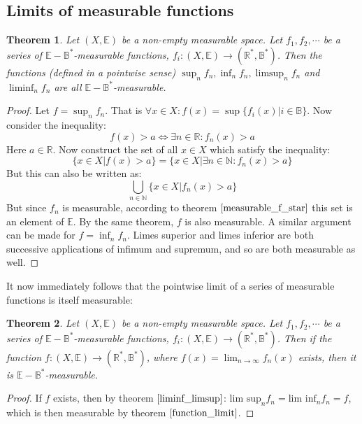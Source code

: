 \documentclass[12pt, a4paper]{article}
\newtheorem{theorem}{Theorem}[section]
\numberwithin{equation}{section}
\begin{document}
\subsection{Limits of measurable functions}
\begin{theorem}
\label{function_limit}
Let $(X,\mathbb{E})$ be a non-empty measurable space. Let $f_1,f_2,\cdots$ be a series of $\mathbb{E}-\mathbb{B}^*$-measurable functions, $f_i: (X,\mathbb{E})\rightarrow(\mathbb{R}^*,\mathbb{B}^*)$. Then the functions (defined in a pointwise sense) $\sup_n f_n, \inf_n f_n, \limsup_n f_n$ and $\liminf_n f_n$ are all $\mathbb{E}-\mathbb{B}^*$-measurable.
\end{theorem}
\begin{proof}
Let $f=\sup_n f_n$. That is $\forall x\in X: f(x)=\sup\{f_i(x)|i\in\mathbb{B}\}$. Now consider the inequality:
\begin{equation}
f(x)>a\Leftrightarrow\exists n\in\mathbb{R}: f_n(x)>a
\end{equation}
Here $a\in\mathbb{R}$. Now construct the set of all $x\in X$ which satisfy the inequality:
\begin{equation}
\{x\in X|f(x)>a\}=\{x\in X|\exists n\in\mathbb{N}: f_n(x)>a\}
\end{equation}
But this can also be written as:
\begin{equation}
\bigcup_{n\in\mathbb{N}}\{x\in X|f_n(x)>a\}
\end{equation}
But since $f_n$ is measurable, according to theorem $\ref{measurable_f_star}$ this set is an element of $\mathbb{E}$. By the same theorem, $f$ is also measurable. A similar argument can be made for $f=\inf_n f_n$. Limes superior and limes inferior are both successive applications of infimum and supremum, and so are both measurable as well.
\end{proof}

It now immediately follows that the pointwise limit of a series of measurable functions is itself measurable:

\begin{theorem}
Let $(X,\mathbb{E})$ be a non-empty measurable space. Let $f_1,f_2,\cdots$ be a series of $\mathbb{E}-\mathbb{B}^*$-measurable functions, $f_i: (X,\mathbb{E})\rightarrow(\mathbb{R}^*,\mathbb{B}^*)$. Then if the function $f: (X,\mathbb{E})\rightarrow(\mathbb{R}^*,\mathbb{B}^*)$, where $f(x)=\lim_{n\rightarrow\infty}f_n(x)$ exists, then it is $\mathbb{E}-\mathbb{B}^*$-measurable.
\end{theorem}
\begin{proof}
If $f$ exists, then by theorem $\ref{liminf_limsup}$: $\textrm{lim sup}_n f_n=\textrm{lim inf}_n f_n=f$, which is then measurable by theorem $\ref{function_limit}$.
\end{proof}
\end{document}
